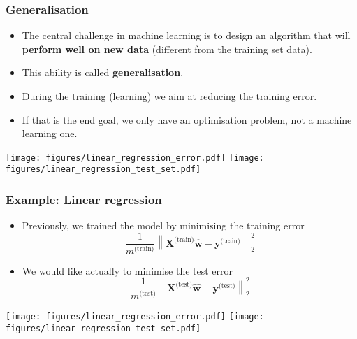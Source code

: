 \documentclass[notes]{beamer}          %
\newcommand{\vect}[1]{\bm{#1}}
\newcommand{\norm}[1]{\left\lVert#1\right\rVert}
\providecommand{\norm}[1]{\lVert#1\rVert}
\newif\iffull
\begin{document}
\begin{frame}[allowframebreaks]
\frametitle{Generalisation}
    \begin{itemize}
        \item The central challenge in machine learning is to design an algorithm that will \textbf{perform well on new data} (different from the training set data).
        \item This ability is called {\bf generalisation}.
\iffull
        \item {\bf Training error} is the error computed on the training set.
\fi
\framebreak
        \item During the training (learning) we aim at reducing the training error.
        \item If that is the end goal, we only have an optimisation problem, not a machine learning one.
    \end{itemize}
    \begin{center}
            \texttt{[image: figures/linear\_regression\_error.pdf]}
            \texttt{[image: figures/linear\_regression\_test\_set.pdf]}
    \end{center}
\end{frame}

\iffull
\begin{frame}
\frametitle{Generalisation error}
    \begin{itemize}
        \item {\bf Generalisation error}, also called {\bf test error} is defined as the expected error on new, previously unseen data.
        \item Unlike in simple optimisation, in machine learning our main goal is to minimise the {\bf generalisation error}.
        \item Usually the generalisation error is estimated by measuring the performance on a {\bf test data set} which must be \textbf{independent} from the training set.
    \end{itemize}
\end{frame}
\fi

\begin{frame}
\frametitle{Example: Linear regression}
 \begin{itemize}
        \item Previously, we trained the model by minimising the training error
        $$
        \frac{1}{m^{\mbox{(train)}}}\norm{\vect{X}^{\mbox{(train)}}\hat{\vect{w}} - \vect{y}^{\mbox{(train)}}}_2^2
        $$
        \item We would like actually to minimise the test error
         $$
        \frac{1}{m^{\mbox{(test)}}}\norm{\vect{X}^{\mbox{(test)}}\hat{\vect{w}} - \vect{y}^{\mbox{(test)}}}_2^2
        $$
\end{itemize}
\begin{center}
        \texttt{[image: figures/linear\_regression\_error.pdf]}
        \texttt{[image: figures/linear\_regression\_test\_set.pdf]}
\end{center}
\end{frame}
\end{document}
